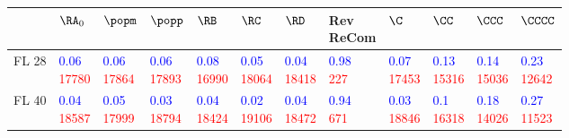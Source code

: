 \begin{tabular}{llllllllllll}
\toprule
{} &                                                      $\RA_0$ &                                                      $\popm$ &                                                      $\popp$ &                                                        $\RB$ &                                                        $\RC$ &                                                        $\RD$ &                                     \makecell{Rev \\ ReCom} &                                                         $\C$ &                                                        $\CC$ &                                                       $\CCC$ &                                                      $\CCCC$ \\
\midrule
FL 28  &  \makecell{\textcolor{blue}{0.06} \\ \textcolor{red}{17780}} &  \makecell{\textcolor{blue}{0.06} \\ \textcolor{red}{17864}} &  \makecell{\textcolor{blue}{0.06} \\ \textcolor{red}{17893}} &  \makecell{\textcolor{blue}{0.08} \\ \textcolor{red}{16990}} &  \makecell{\textcolor{blue}{0.05} \\ \textcolor{red}{18064}} &  \makecell{\textcolor{blue}{0.04} \\ \textcolor{red}{18418}} &   \makecell{\textcolor{blue}{0.98} \\ \textcolor{red}{227}} &  \makecell{\textcolor{blue}{0.07} \\ \textcolor{red}{17453}} &  \makecell{\textcolor{blue}{0.13} \\ \textcolor{red}{15316}} &  \makecell{\textcolor{blue}{0.14} \\ \textcolor{red}{15036}} &  \makecell{\textcolor{blue}{0.23} \\ \textcolor{red}{12642}} \\
FL 40  &  \makecell{\textcolor{blue}{0.04} \\ \textcolor{red}{18587}} &  \makecell{\textcolor{blue}{0.05} \\ \textcolor{red}{17999}} &  \makecell{\textcolor{blue}{0.03} \\ \textcolor{red}{18794}} &  \makecell{\textcolor{blue}{0.04} \\ \textcolor{red}{18424}} &  \makecell{\textcolor{blue}{0.02} \\ \textcolor{red}{19106}} &  \makecell{\textcolor{blue}{0.04} \\ \textcolor{red}{18472}} &   \makecell{\textcolor{blue}{0.94} \\ \textcolor{red}{671}} &  \makecell{\textcolor{blue}{0.03} \\ \textcolor{red}{18846}} &   \makecell{\textcolor{blue}{0.1} \\ \textcolor{red}{16318}} &  \makecell{\textcolor{blue}{0.18} \\ \textcolor{red}{14026}} &  \makecell{\textcolor{blue}{0.27} \\ \textcolor{red}{11523}} \\

\end{tabular}
